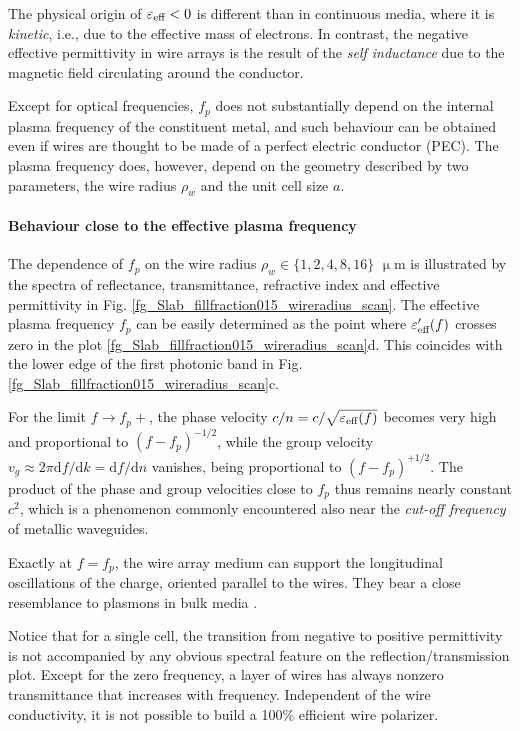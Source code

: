 The physical origin of $\varepsilon_{\text{eff} }<0$ is different than in continuous media, where it is \textit{kinetic}, i.e., due to the effective mass of electrons. In contrast, the negative effective permittivity in wire arrays is the result of the \textit{self inductance} due to the magnetic field circulating around the conductor. 

Except for optical frequencies, $f_p$ does not substantially depend on the internal plasma frequency of the constituent metal, and such behaviour can be obtained even if wires are thought to be made of a perfect electric conductor (PEC).
The plasma frequency does, however, depend on the geometry described by two parameters, the wire radius $\rho_w$ and the unit cell size $a$. 

\paragraph{Behaviour close to the effective plasma frequency}
The dependence of $f_p$ on the wire radius $\rho_w \in \{1, 2, 4, 8, 16\}$ $\upmu$m is illustrated by the spectra of reflectance, transmittance, refractive index and effective permittivity in Fig. \ref{fg_Slab_fillfraction015_wireradius_scan}. The effective plasma frequency $f_p$ can be easily determined as the point where $\varepsilon_{\text{eff} }'(f)$ crosses zero  in the plot \ref{fg_Slab_fillfraction015_wireradius_scan}d. This coincides with the lower edge of the first photonic band in Fig. \ref{fg_Slab_fillfraction015_wireradius_scan}c. 

For the limit $f \rightarrow f_p+$, the phase velocity $c/n = c/\sqrt{\varepsilon_{\text{eff} }(f)}$ becomes very high and proportional to $(f-f_p)^{-1/2}$, while the group velocity $v_g \approx 2\pi \mathrm{d}f/\mathrm{d}k = \mathrm{d}f/\mathrm{d}n$ vanishes, being proportional to $(f-f_p)^{+1/2}$. The product of the phase and group velocities close to $f_p$ thus remains nearly constant $c^2$, which is a phenomenon commonly encountered also near the \textit{cut-off frequency} of metallic waveguides.

Exactly at $f=f_p$, the wire array medium can support the longitudinal oscillations of the charge, oriented parallel to the wires. They bear a close resemblance to plasmons in bulk media \cite{pendry1996extremely}.

Notice that for a single cell, the transition from negative to positive permittivity is not accompanied by any obvious spectral feature on the reflection/transmission plot. Except for the zero frequency, a layer of wires has always nonzero transmittance that increases with frequency. Independent of the wire conductivity, it is not possible to build a 100\% efficient wire polarizer.

